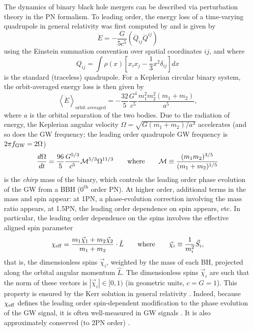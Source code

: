 \begin{refsection}
The dynamics of binary black hole mergers can be described via perturbation theory in the \ac{PN} formalism. To leading order, the energy loss of a time-varying quadrupole in general relativity was first computed by \citet{Einstein:1918btx} and is given by
\begin{equation}
    \dot{E} = -\frac{G}{5c^5}\left(\dddot{Q}_{ij}\dddot{Q}^{ij}\right)
\end{equation}
using the Einstein summation convention over spatial coordinates $ij$, and where 
\begin{equation}
    Q_{ij} = \int \rho(x)[x_ix_j-\frac{1}{3}x^2\delta_{ij}]dx
\end{equation}
is the standard (traceless) quadrupole.
For a Keplerian circular binary system, the orbit-averaged energy loss is then given by
\begin{equation}
    \left\langle\dot{E}\right\rangle_\text{orbit averaged} = -\frac{32}{5}\frac{G^4}{c^5}\frac{m_1^2m_2^2(m_1+m_2)}{a^5},
\end{equation}
where $a$ is the orbital separation of the two bodies. Due to the radiation of energy, the Keplerian angular velocity $\Omega = \sqrt{G(m_1+m_2)/a^3}$ accelerates (and so does the \ac{GW} frequency; the leading order quadrupole \ac{GW} frequency is $2\pi f_{\rm GW} = 2\Omega$)
\begin{equation}
    \frac{d\Omega}{dt} = \frac{96}{5} \frac{G^{5/3}}{c^5} \mathcal{M} ^{5/3} \Omega^{11/3} \qquad \text{where} \qquad \mathcal{M} \equiv \frac{(m_1m_2)^{3/5}}{(m_1+m_2)^{1/5}}
\end{equation}
is the \textit{chirp} mass of the binary, which controls the leading order phase evolution of the \ac{GW} from a \ac{BBH} ($0^\text{th}$ order \ac{PN}). At higher order, additional terms in the mass and spin appear: at 1\ac{PN}, a phase-evolution correction involving the mass ratio appears, at 1.5\ac{PN}, the leading order dependence on spin appears, etc.  In particular, the leading order dependence on the spins involves the effective aligned spin parameter \citep{Ajith:2009bn, Santamaria:2010yb}
\begin{equation}
    \chi_{\rm eff} = \frac{m_1\vec{\chi}_1 + m_2\vec{\chi}_2}{m_1 + m_2}\cdot \hat{L} \qquad \text{where} \qquad \vec{\chi}_i \equiv \frac{1}{m_i^2}\vec{S}_i,
\end{equation}
that is, the dimensionless spins $\vec{\chi}_i$, weighted by the mass of each \ac{BH}, projected along the orbital angular momentum $\hat{L}$. 
The dimensionless spins $\vec{\chi}_i$ are such that the norm of these vectors is $|\vec{\chi}_i| \in [0,1)$ (in geometric units, $c=G=1$). This property is ensured by the Kerr solution in general relativity \citep{Kerr:1963ud, Teukolsky:2014vca}. 
Indeed, because $\chi_{\rm eff}$ defines the leading order spin-dependent modification to the phase evolution of the \ac{GW} signal, it is often well-measured in \ac{GW} signals \citep{Vitale:2016avz}. It is also approximately conserved (to 2PN order) \citep{Racine:2008qv}. 


\end{refsection}
